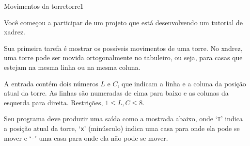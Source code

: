 \documentclass[12pt,a4paper,oneside]{article}
\begin{document}
\begin{problem}{Movimentos da torre}{torre}{1}

Você começou a participar de um projeto que está desenvolvendo um tutorial de xadrez.




Sua primeira tarefa é mostrar os possíveis movimentos de uma torre. No xadrez, uma torre pode ser movida ortogonalmente no tabuleiro, ou seja, para casas que estejam na mesma linha ou na mesma coluna.

%

\InputFile

A entrada contém dois números $L$ e $C$, que indicam a linha e a coluna da posição atual da torre. As linhas são numeradas de cima para baixo e as colunas da esquerda para direita. Restrições, $1 \leq L, C \leq 8$.


\OutputFile

Seu programa deve produzir uma saída como a mostrada abaixo, onde `\texttt{T}' indica a posição atual da torre, `\texttt{x}' (minúsculo) indica uma casa para onde ela pode se mover e `\texttt{-}' uma casa para onde ela não pode se mover.

\Example

\begin{example}
%
\end{example}

\begin{example}
%
\end{example}





\end{problem}
\end{document}
